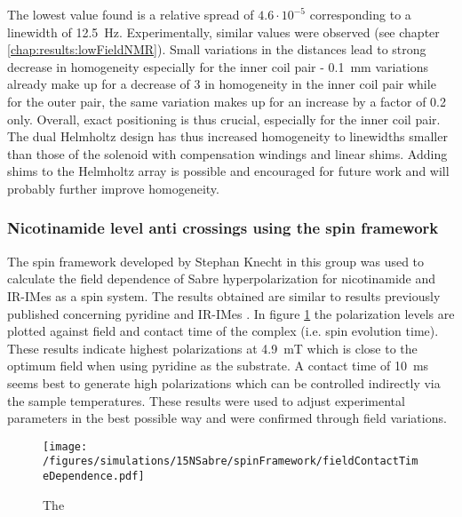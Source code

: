         The lowest value found is a relative spread of $4.6 \cdot 10^{-5}$ corresponding to a linewidth of \SI{12.5}{\hertz}. Experimentally, similar values were observed (see chapter \ref{chap:results:lowFieldNMR}). Small variations in the distances lead to strong decrease in homogeneity especially for the inner coil pair - \SI{0.1}{\milli\meter} variations already make up for a decrease of 3 in homogeneity in the inner coil pair while for the outer pair, the same variation makes up for an increase by a factor of 0.2 only. Overall, exact positioning is thus crucial, especially for the inner coil pair. The dual Helmholtz design has thus increased homogeneity to linewidths smaller than those of the solenoid with compensation windings and linear shims. Adding shims to the Helmholtz array is possible and encouraged for future work and will probably further improve homogeneity.
        \subsubsection{Nicotinamide level anti crossings using the spin framework}
        The spin framework developed by Stephan Knecht in this group \cite{knecht_spin_2014} was used to calculate the field dependence of Sabre hyperpolarization for nicotinamide and IR-IMes as a spin system. The results obtained are similar to results previously published concerning pyridine and IR-IMes \cite{hovener_continuous_2014-1}. In figure \ref{figure:results:simulation:nicotinamideSpinSystem} the polarization levels are plotted against field and contact time of the complex (i.e. spin evolution time). These results indicate highest polarizations at \SI{4.9}{\milli\tesla} which is close to the optimum field when using pyridine as the substrate. A contact time of \SI{10}{\milli\second} seems best to generate high polarizations which can be controlled indirectly via the sample temperatures. These results were used to adjust experimental parameters in the best possible way and were confirmed through field variations.
        \begin{figure}
            \centering
            \texttt{[image: /figures/simulations/15NSabre/spinFramework/fieldContactTimeDependence.pdf]}
            \caption[Spin density matrix calculations]{The }
            \label{figure:results:simulation:nicotinamideSpinSystem}
        \end{figure}
